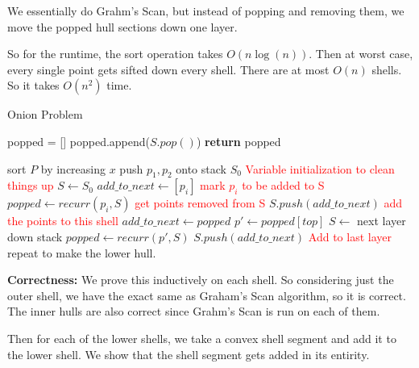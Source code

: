 \documentclass[11pt]{article}
\begin{document}
We essentially do Grahm's Scan, but instead of popping and removing them,
we move the popped hull sections down one layer.

So for the runtime, the sort operation takes $O(n \log (n))$. Then at worst case, every single point gets sifted down every shell. 
There are at most $O(n)$ shells. So it takes $O(n^2)$ time.

\begin{algorithm}
    \caption{Onion Problem}
    \label{alg:onion}

    \begin{algorithmic}[1]
            \State popped = []
                \State popped.append($S.pop()$)
            \EndWhile
            \State \textbf{return} popped
        \EndFunction
        \end{algorithmic}

    \begin{algorithmic}[1]
        \State sort $P$ by increasing $x$
        \State push $p_1, p_2$ onto stack $S_0$
            \State \textcolor{red}{Variable initialization to clean things up}
            \State $S \gets S_0$ 
            \State $add\_to\_next \gets [p_i]$ \quad \textcolor{red}{mark $p_i$ to be added to S}
            \State $popped \gets recurr(p_i,S)$ \quad \textcolor{red}{get points removed from S}
                \State $S.push(add\_to\_next)$ \quad \textcolor{red}{add the points to this shell}
                \State $add\_to\_next \gets popped$
                \State $p' \gets popped[top]$
                \State $S \gets$ next layer down stack
                \State $popped \gets recurr(p', S)$
            \EndWhile
            \State $S.push(add\_to\_next)$ \quad \textcolor{red}{Add to last layer}
        \EndFor
        \State repeat to make the lower hull.
    \EndFunction
    \end{algorithmic}
\end{algorithm}

\textbf{Correctness:} We prove this inductively on each shell. So considering just the outer shell,
we have the exact same as Graham's Scan algorithm, so it is correct. 
The inner hulls are also correct since Grahm's Scan is run on each of them.  

Then for each of the lower shells, we take a convex shell segment and add it to the lower shell. 
We show that the shell segment gets added in its entirity.
\end{document}
